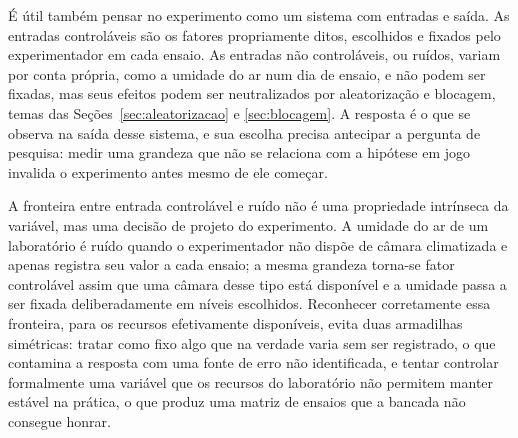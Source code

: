 \documentclass{doeapostila}
\begin{document}
É útil também pensar no experimento como um sistema com entradas e saída. As
entradas controláveis são os fatores propriamente ditos, escolhidos e
fixados pelo experimentador em cada ensaio. As entradas não controláveis, ou
ruídos, variam por conta própria, como a umidade do ar num dia de ensaio, e
não podem ser fixadas, mas seus efeitos podem ser neutralizados por
aleatorização e blocagem, temas das Seções~\ref{sec:aleatorizacao} e
\ref{sec:blocagem}. A resposta é o que se observa na saída desse sistema, e
sua escolha precisa antecipar a pergunta de pesquisa: medir uma grandeza que
não se relaciona com a hipótese em jogo invalida o experimento antes mesmo
de ele começar.

A fronteira entre entrada controlável e ruído não é uma propriedade
intrínseca da variável, mas uma decisão de projeto do experimento. A
umidade do ar de um laboratório é ruído quando o experimentador não dispõe
de câmara climatizada e apenas registra seu valor a cada ensaio; a mesma
grandeza torna-se fator controlável assim que uma câmara desse tipo está
disponível e a umidade passa a ser fixada deliberadamente em níveis
escolhidos. Reconhecer corretamente essa fronteira, para os recursos
efetivamente disponíveis, evita duas armadilhas simétricas: tratar como
fixo algo que na verdade varia sem ser registrado, o que contamina a
resposta com uma fonte de erro não identificada, e tentar controlar
formalmente uma variável que os recursos do laboratório não permitem
manter estável na prática, o que produz uma matriz de ensaios que a
bancada não consegue honrar.
\end{document}
